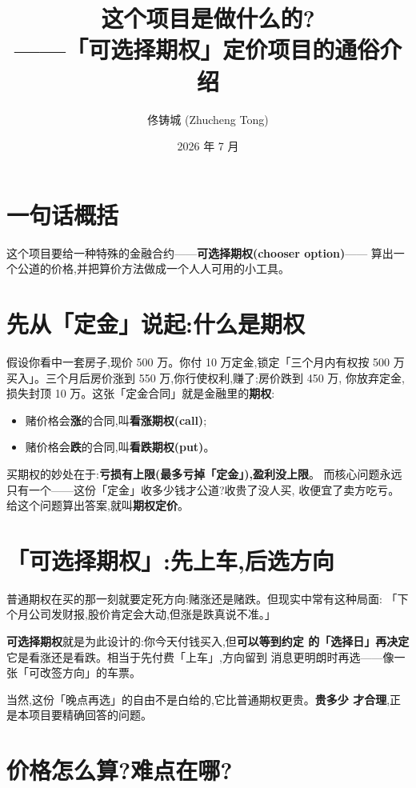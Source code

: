 \documentclass[11pt]{ctexart}
\title{\textbf{这个项目是做什么的?}\\
\large ——「可选择期权」定价项目的通俗介绍}
\author{佟铸城 (Zhucheng Tong)}
\date{2026 年 7 月}
\begin{document}
\maketitle

\section{一句话概括}

这个项目要给一种特殊的金融合约——\textbf{可选择期权(chooser option)}——
算出一个公道的价格,并把算价方法做成一个人人可用的小工具。

\section{先从「定金」说起:什么是期权}

假设你看中一套房子,现价 500 万。你付 10 万定金,锁定「三个月内有权按
500 万买入」。三个月后房价涨到 550 万,你行使权利,赚了;房价跌到 450 万,
你放弃定金,损失封顶 10 万。这张「定金合同」就是金融里的\textbf{期权}:

\begin{itemize}
  \item 赌价格会\textbf{涨}的合同,叫\textbf{看涨期权(call)};
  \item 赌价格会\textbf{跌}的合同,叫\textbf{看跌期权(put)}。
\end{itemize}

买期权的妙处在于:\textbf{亏损有上限(最多亏掉「定金」),盈利没上限}。
而核心问题永远只有一个——这份「定金」收多少钱才公道?收贵了没人买,
收便宜了卖方吃亏。给这个问题算出答案,就叫\textbf{期权定价}。

\section{「可选择期权」:先上车,后选方向}

普通期权在买的那一刻就要定死方向:赌涨还是赌跌。但现实中常有这种局面:
「下个月公司发财报,股价肯定会大动,但涨是跌真说不准。」

\textbf{可选择期权}就是为此设计的:你今天付钱买入,但\textbf{可以等到约定
的「选择日」再决定}它是看涨还是看跌。相当于先付费「上车」,方向留到
消息更明朗时再选——像一张「可改签方向」的车票。

当然,这份「晚点再选」的自由不是白给的,它比普通期权更贵。\textbf{贵多少
才合理},正是本项目要精确回答的问题。

\section{价格怎么算?难点在哪?}
\end{document}
